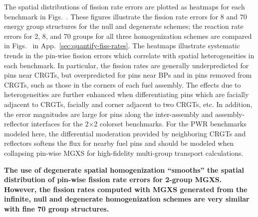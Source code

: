 The spatial distributions of fission rate errors are plotted as heatmaps for each benchmark in Figs.~. These figures illustrate the fission rate errors for 8 and 70 energy group structures for the null and degenerate schemes; the reaction rate errors for 2, 8, and 70 groups for all three homogenization schemes are compared in Figs.~ in App.~\ref{sec:quantify-fiss-rates}. The heatmaps illustrate systematic trends in the pin-wise fission errors which correlate with spatial heterogeneities in each benchmark. In particular, the fission rates are generally underpredicted for pins near \acp{CRGT}, but overpredicted for pins near \acp{BP} and in pins removed from \acp{CRGT}, such as those in the corners of each fuel assembly. The effects due to heterogeneities are further enhanced when differentiating pins which are facially adjacent to \acp{CRGT}, facially and corner adjacent to two \acp{CRGT}, etc. In addition, the error magnitudes are large for pins along the inter-assembly and assembly-reflector interfaces for the 2$\times$2 colorset benchmarks. For the \ac{PWR} benchmarks modeled here, the differential moderation provided by neighboring \acp{CRGT} and reflectors softens the flux for nearby fuel pins and should be modeled when collapsing pin-wise \ac{MGXS} for high-fidelity multi-group transport calculations.


\begin{emphbox}
\textbf{The use of degenerate spatial homogenization ``smooths'' the spatial distribution of pin-wise fission rate errors for 2-group \ac{MGXS}. However, the fission rates computed with \ac{MGXS} generated from the infinite, null and degenerate homogenization schemes are very similar with fine 70 group structures.}
\end{emphbox}

